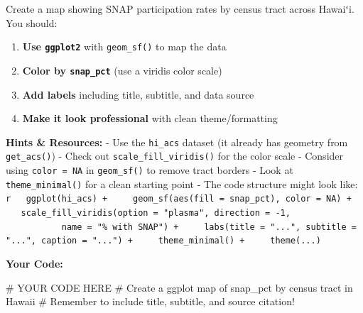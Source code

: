 \documentclass[
  letterpaper,
  DIV=11,
  numbers=noendperiod]{scrartcl}
\newenvironment{Shaded}{\begin{snugshade}}{\end{snugshade}}
\newcommand{\CommentTok}[1]{\textcolor[rgb]{0.37,0.37,0.37}{#1}}
\providecommand{\tightlist}{%
  \setlength{\itemsep}{0pt}\setlength{\parskip}{0pt}}\usepackage{longtable,booktabs,array}
\begin{document}
\begin{tcolorbox}[enhanced jigsaw, title=\textcolor{quarto-callout-warning-color}{\faExclamationTriangle}\hspace{0.5em}{Your Task}, titlerule=0mm, coltitle=black, colbacktitle=quarto-callout-warning-color!10!white, colback=white, left=2mm, toprule=.15mm, opacitybacktitle=0.6, toptitle=1mm, colframe=quarto-callout-warning-color-frame, bottomtitle=1mm, arc=.35mm, bottomrule=.15mm, breakable, leftrule=.75mm, opacityback=0, rightrule=.15mm]

Create a map showing SNAP participation rates by census tract across
Hawaiʻi. You should:

\begin{enumerate}
\def\labelenumi{\arabic{enumi}.}
\tightlist
\item
  \textbf{Use \texttt{ggplot2}} with \texttt{geom\_sf()} to map the data
\item
  \textbf{Color by \texttt{snap\_pct}} (use a viridis color scale)
\item
  \textbf{Add labels} including title, subtitle, and data source
\item
  \textbf{Make it look professional} with clean theme/formatting
\end{enumerate}

\textbf{Hints \& Resources:} - Use the \texttt{hi\_acs} dataset (it
already has geometry from \texttt{get\_acs()}) - Check out
\texttt{scale\_fill\_viridis()} for the color scale - Consider using
\texttt{color\ =\ NA} in \texttt{geom\_sf()} to remove tract borders -
Look at \texttt{theme\_minimal()} for a clean starting point - The code
structure might look like:
\texttt{r\ \ \ ggplot(hi\_acs)\ +\ \ \ \ \ geom\_sf(aes(fill\ =\ snap\_pct),\ color\ =\ NA)\ +\ \ \ \ \ scale\_fill\_viridis(option\ =\ "plasma",\ direction\ =\ -1,\ \ \ \ \ \ \ \ \ \ \ \ \ \ \ \ \ \ \ \ \ \ \ \ \ name\ =\ "\%\ with\ SNAP")\ +\ \ \ \ \ labs(title\ =\ "...",\ subtitle\ =\ "...",\ caption\ =\ "...")\ +\ \ \ \ \ theme\_minimal()\ +\ \ \ \ \ theme(...)}

\textbf{Your Code:}

\end{tcolorbox}

\begin{Shaded}
\begin{Highlighting}[]
\CommentTok{\# YOUR CODE HERE}
\CommentTok{\# Create a ggplot map of snap\_pct by census tract in Hawaii}
\CommentTok{\# Remember to include title, subtitle, and source citation!}
\end{Highlighting}
\end{Shaded}
\end{document}
